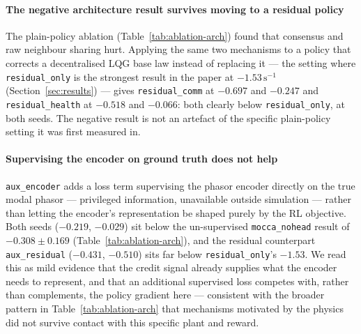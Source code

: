 \documentclass[preprint,11pt,authoryear]{elsarticle}
\begin{document}
\paragraph{The negative architecture result survives moving to a residual policy}
The plain-policy ablation (Table~\ref{tab:ablation-arch}) found that consensus
and raw neighbour sharing hurt. Applying the same two mechanisms to a policy
that corrects a decentralised LQG base law instead of replacing it --- the
setting where \texttt{residual\_only} is the strongest result in the paper at
$-1.53\,\mathrm{s}^{-1}$ (Section~\ref{sec:results}) --- gives
\texttt{residual\_comm} at $-0.697$ and $-0.247$ and \texttt{residual\_health}
at $-0.518$ and $-0.066$: both clearly below \texttt{residual\_only}, at both
seeds. The negative result is not an artefact of the specific plain-policy
setting it was first measured in.

\paragraph{Supervising the encoder on ground truth does not help}
\texttt{aux\_encoder} adds a loss term supervising the phasor encoder directly
on the true modal phasor --- privileged information, unavailable outside
simulation --- rather than letting the encoder's representation be shaped
purely by the RL objective. Both seeds ($-0.219$, $-0.029$) sit below the
un-supervised \texttt{mocca\_nohead} result of $-0.308\pm0.169$
(Table~\ref{tab:ablation-arch}), and the residual counterpart
\texttt{aux\_residual} ($-0.431$, $-0.510$) sits far below
\texttt{residual\_only}'s $-1.53$. We read this as mild evidence that the
credit signal already supplies what the encoder needs to represent, and that
an additional supervised loss competes with, rather than complements, the
policy gradient here --- consistent with the broader pattern in
Table~\ref{tab:ablation-arch} that mechanisms motivated by the physics did not
survive contact with this specific plant and reward.
\end{document}
